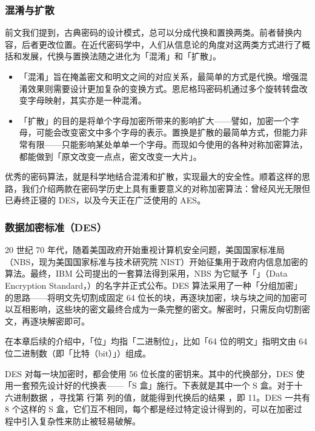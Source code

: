 \subsubsection{混淆与扩散}

前文我们提到，古典密码的设计模式，总可以分成代换和置换两类。前者替换内容，后者更改位置。在近代密码学中，人们从信息论的角度对这两类方式进行了概括和发展，代换与置换法随之进化为「混淆」和「扩散」。

\begin{itemize}
  \item 「混淆」旨在掩盖密文和明文之间的对应关系，最简单的方式是代换。增强混淆效果则需要设计更加复杂的变换方式。恩尼格玛密码机通过多个旋转转盘改变字母映射，其实亦是一种混淆。
  \item 「扩散」的目的是将单个字母加密所带来的影响扩大——譬如，加密一个字母，可能会改变密文中多个字母的表示。置换是扩散的最简单方式，但能力非常有限——只能影响某处单单一个字母。而现如今使用的各种对称加密算法，都能做到「原文改变一点点，密文改变一大片」。
\end{itemize}

优秀的密码算法，就是科学地结合混淆和扩散，实现最大的安全性。顺着这样的思路，我们介绍两款在密码学历史上具有重要意义的对称加密算法：曾经风光无限但已寿终正寝的 DES，以及今天正在广泛使用的 AES。

\subsubsection{数据加密标准（DES）}

20 世纪 70 年代，随着美国政府开始重视计算机安全问题，美国国家标准局（NBS，现为美国国家标准与技术研究院 NIST）开始征集用于政府内信息加密的算法。最终，IBM 公司提出的一套算法得到采用，NBS 为它赋予「」（Data Encryption Standard，）的名字并正式公布。DES 算法采用了一种「分组加密」的思路——将明文先切割成固定 64 位长的块，再逐块加密，块与块之间的加密可以互相影响，这些块的密文最终合成为一条完整的密文。解密时，只需反向切割密文，再逐块解密即可。

\begin{note}
  在本章后续的介绍中，「位」均指「二进制位」，比如「64 位的明文」指明文由 64 位二进制数（即「比特（bit）」）组成。
\end{note}

DES 对每一块加密时，都会使用 56 位长度的密钥来。其中的代换部分，DES 使用一套预先设计好的代换表——「S 盒」施行。下表就是其中一个 S 盒。对于十六进制数据 ，寻找第  行第  列的值，就能得到代换后的结果 ，即 11。DES 一共有 8 个这样的 S 盒，它们互不相同，每个都是经过特定设计得到的，可以在加密过程中引入复杂性来防止被轻易破解。

